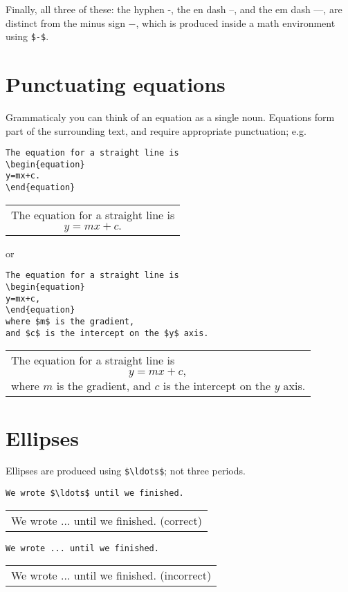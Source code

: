 \documentclass[a4paper]{tufte-handout}
\begin{document}
Finally, all three of these: the hyphen -, the en dash --, and the em dash ---, are distinct from the minus sign $-$, which is produced inside a math environment using \lstinline{$-$}.


\section{Punctuating equations} 
Grammaticaly you can think of an equation as a single noun. Equations form part of the surrounding text, and require appropriate punctuation; e.g.
\begin{lstlisting}
The equation for a straight line is
\begin{equation}
y=mx+c.
\end{equation}
\end{lstlisting}
\begin{tabular}{|p{10cm}}
The equation for a straight line is
\begin{equation*}
y=mx+c.
\end{equation*}
\end{tabular}

or

\begin{lstlisting}
The equation for a straight line is
\begin{equation}
y=mx+c,
\end{equation}
where $m$ is the gradient, 
and $c$ is the intercept on the $y$ axis.
\end{lstlisting}
\begin{tabular}{|p{10cm}}
The equation for a straight line is
\begin{equation*}
y=mx+c,
\end{equation*}
where $m$ is the gradient, 
and $c$ is the intercept on the $y$ axis.
\end{tabular}

\section{Ellipses} 
Ellipses are produced using \lstinline|$\ldots$|; not three periods.
\begin{lstlisting}
We wrote $\ldots$ until we finished. 
\end{lstlisting}
\begin{tabular}{|p{10cm}}
We wrote $\ldots$ until we finished. (correct)
\end{tabular}

\begin{lstlisting}
We wrote ... until we finished.
\end{lstlisting}
\begin{tabular}{|p{10cm}}
We wrote ... until we finished. (incorrect)
\end{tabular}
\end{document}
